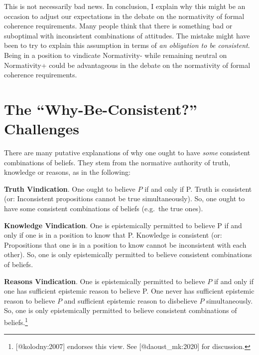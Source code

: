 \documentclass[
]{article}
\begin{document}
This is not necessarily bad news. In conclusion, I explain why this
might be an occasion to adjust our expectations in the debate on the
normativity of formal coherence requirements. Many people think that
there is something bad or suboptimal with inconsistent combinations of
attitudes. The mistake might have been to try to explain this assumption
in terms of \emph{an obligation to be consistent}. Being in a position
to vindicate Normativity- while remaining neutral on Normativity+ could
be advantageous in the debate on the normativity of formal coherence
requirements.

\hypertarget{PREFIXthe-why-be-consistent-challenges}{%
\section{The ``Why-Be-Consistent?''
Challenges}\label{PREFIXthe-why-be-consistent-challenges}}

There are many putative explanations of why one ought to have
\emph{some} consistent combinations of beliefs. They stem from the
normative authority of truth, knowledge or reasons, as in the following:

\textbf{Truth Vindication}. One ought to believe \(P\) if and only if P.
Truth is consistent (or: Inconsistent propositions cannot be true
simultaneously). So, one ought to have some consistent combinations of
beliefs (e.g.~the true ones).

\textbf{Knowledge Vindication}. One is epistemically permitted to
believe P if and only if one is in a position to know that P. Knowledge
is consistent (or: Propositions that one is in a position to know cannot
be inconsistent with each other). So, one is only epistemically
permitted to believe consistent combinations of beliefs.

\textbf{Reasons Vindication}. One is epistemically permitted to believe
\(P\) if and only if one has sufficient epistemic reason to believe P.
One never has sufficient epistemic reason to believe \(P\) and
sufficient epistemic reason to disbelieve \(P\) simultaneously. So, one
is only epistemically permitted to believe consistent combinations of
beliefs.\footnote{{[}@kolodny:2007{]} endorses this view. See
  {[}@daoust\_mk:2020{]} for discussion.}
\end{document}
